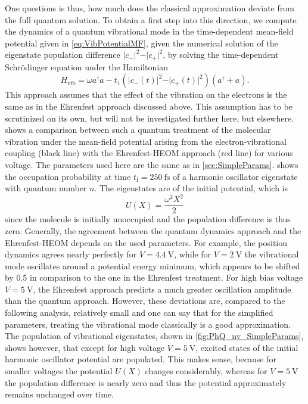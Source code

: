 \documentclass{article}
\begin{document}
One questions is thus, how much does the classical approximation deviate from the full quantum solution. To obtain a first step into this direction, we compute the dynamics of a quantum vibrational mode in the time-dependent mean-field potential given in \cref{eq:VibPotentialMF}, given the numerical solution of the eigenstate population difference $\vert c_-\vert^2 - \vert c_+\vert^2$, by solving the time-dependent Schrödinger equation under the Hamiltonian
\begin{equation}
	H_\mathrm{vib} = \omega a^\dagger a - t_1 (\vert c_-(t)\vert^2 - \vert c_+(t)\vert^2) (a^\dagger + a).
\end{equation} 
This approach assumes that the effect of the vibration on the electrons is the same as in the Ehrenfest approach discussed above. This assumption has to be scrutinized on its own, but will not be investigated further here, but elsewhere.
 shows a comparison between such a quantum treatment of the molecular vibration under the mean-field potential arising from the electron-vibrational coupling (black line) with the Ehrenfest-HEOM approach (red line) for various voltage. The parameters used here are the same as in \cref{sec:SimpleParams}. 
 shows the occupation probability at time $t_\mathrm{f} = \SI{250}{\femto\second}$ of a harmonic oscillator eigenstate with quantum number $n$. 
The eigenstates are of the initial potential, which is 
\begin{equation}
	U(X) = \frac{\omega^2X^2}{2}
\end{equation}
since the molecule is initially unoccupied and the population difference is thus zero.
Generally, the agreement between the quantum dynamics approach and the Ehrenfest-HEOM depends on the used parameters. For example, the position dynamics agrees nearly perfectly for $V= \SI{4.4}{\volt}$, while for $V=\SI{2}{\volt}$ the vibrational mode oscillates around a potential energy minimum, which appears to be shifted by 0.5 in comparison to the one in the Ehrenfest treatment. For high bias voltage $V=\SI{5}{\volt}$, the Ehrenfest approach predicts a much greater oscillation amplitude than the quantum approach. However, these deviations are, compared to the following analysis, relatively small and one can say that for the simplified parameters, treating the vibrational mode classically is a good approximation. 
The population of vibrational eigenstates, shown in \cref{fig:PhQ_nv_SimpleParams}, shows however, that except for high voltage $V=\SI{5}{\volt}$, excited states of the initial harmonic oscillator potential are populated. This makes sense, because for smaller voltages the potential $U(X)$ changes considerably, whereas for $V=\SI{5}{\volt}$ the population difference is nearly zero and thus the potential approximately remains unchanged over time.  
\end{document}
